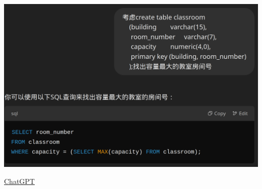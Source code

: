 \documentclass[aspectratio=169, 14pt]{beamer}
\begin{document}
\begin{frame}
	\begin{center}
		\includegraphics[width=.7\paperwidth]{image/chatgpt}
	\end{center}

	{\tiny \href{https://chatgpt.com/share/67bef99e-70e8-8010-abe7-6732a19093c4}{ChatGPT}}

\end{frame}
\end{document}
